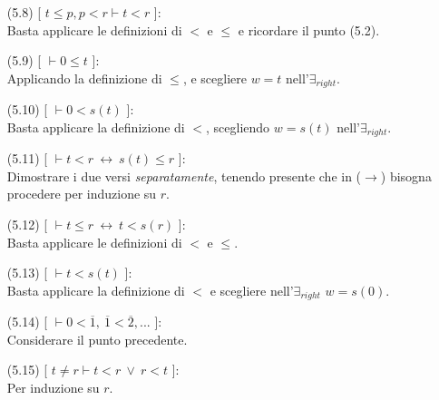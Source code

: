 \begin{enumerate}
\begin{itemize}
\vspace{.5cm}
\end{itemize}
	\item[(5.8)] [ $t\leq p,p<r\vdash t<r$ ]:
	\vspace{.2cm}
	\\Basta applicare le definizioni di $<$ e $\leq$ e ricordare il punto (5.2).
	\vspace{.5cm}
	\item[(5.9)] [ $\vdash 0\leq t$ ]:
	\vspace{.2cm}
	\\Applicando la definizione di $\leq$, e scegliere $w=t$ nell'$\exists_{right}$.
	\vspace{.5cm}
	\item[(5.10)] [ $\vdash 0<s(t)$ ]:
	\vspace{.2cm}
	\\Basta applicare la definizione di $<$, scegliendo $w=s(t)$ nell'$\exists_{right}$.
	\vspace{.5cm}
	\item[(5.11)] [ $\vdash t<r\ \leftrightarrow\ s(t)\leq r$ ]:
	\vspace{.2cm}
	\\Dimostrare i due versi \textsl{separatamente}, tenendo presente che in ($\rightarrow$) bisogna procedere per induzione su $r$.
	\vspace{.5cm}
	\item[(5.12)] [ $\vdash t\leq r\ \leftrightarrow\ t<s(r)$ ]:
	\vspace{.2cm}
	\\Basta applicare le definizioni di $<$ e $\leq$.
	\vspace{.5cm}
	\item[(5.13)] [ $\vdash t<s(t)$ ]:
	\vspace{.2cm}
	\\Basta applicare la definizione di $<$ e scegliere nell'$\exists_{right}$ $w=s(0)$.
	\vspace{.5cm}
	\item[(5.14)] [ $\vdash 0<\overline{1},\ \overline{1}<\overline{2},...$ ]:
	\vspace{.2cm}
	\\Considerare il punto precedente.
	\vspace{.5cm}
	\item[(5.15)] [ $t\neq r\vdash t<r\ \vee\ r<t$ ]:
	\vspace{.2cm}
	\\Per induzione su $r$.
	\vspace{.2cm}

\end{enumerate}

